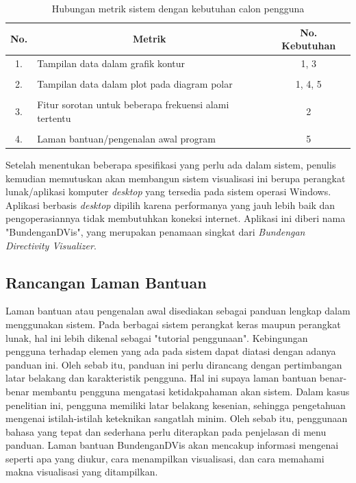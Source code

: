 \begin{table}[t!]
	\centering
	\caption{Hubungan metrik sistem dengan kebutuhan calon pengguna}
	\begin{tabular}{c p{7cm} c}
		\hline
		\textbf{No.} & \multicolumn{1}{c}{\textbf{Metrik}} & \textbf{No. Kebutuhan} \\
		\hline
		1. & Tampilan data dalam grafik kontur & 1, 3 \\
		\\
		2. & Tampilan data dalam plot pada diagram polar & 1, 4, 5 \\
		\\
		3. & Fitur sorotan untuk beberapa frekuensi alami tertentu & 2 \\
		\\
		4. & Laman bantuan/pengenalan awal program & 5 \\
		\hline
	\end{tabular}
	\label{tab:specs}
\end{table}

Setelah menentukan beberapa spesifikasi yang perlu ada dalam sistem, penulis kemudian memutuskan akan membangun sistem visualisasi ini berupa perangkat lunak/aplikasi komputer \emph{desktop} yang tersedia pada sistem operasi Windows. Aplikasi berbasis \emph{desktop} dipilih karena performanya yang jauh lebih baik dan pengoperasiannya tidak membutuhkan koneksi internet. Aplikasi ini diberi nama "BundenganDVis", yang merupakan penamaan singkat dari \emph{Bundengan Directivity Visualizer}. \par 

\subsection{Rancangan Laman Bantuan}
Laman bantuan atau pengenalan awal disediakan sebagai panduan lengkap dalam menggunakan sistem. Pada berbagai sistem perangkat keras maupun perangkat lunak, hal ini lebih dikenal sebagai "tutorial penggunaan". Kebingungan pengguna terhadap elemen yang ada pada sistem dapat diatasi dengan adanya panduan ini. Oleh sebab itu, panduan ini perlu dirancang dengan pertimbangan latar belakang dan karakteristik pengguna. Hal ini supaya laman bantuan benar-benar membantu pengguna mengatasi ketidakpahaman akan sistem. Dalam kasus penelitian ini, pengguna memiliki latar belakang kesenian, sehingga pengetahuan mengenai istilah-istilah keteknikan sangatlah minim. Oleh sebab itu, penggunaan bahasa yang tepat dan sederhana perlu diterapkan pada penjelasan di menu panduan. Laman bantuan BundenganDVis akan mencakup informasi mengenai \bundengan seperti apa yang diukur, cara menampilkan visualisasi, dan cara memahami makna visualisasi yang ditampilkan. \par 

